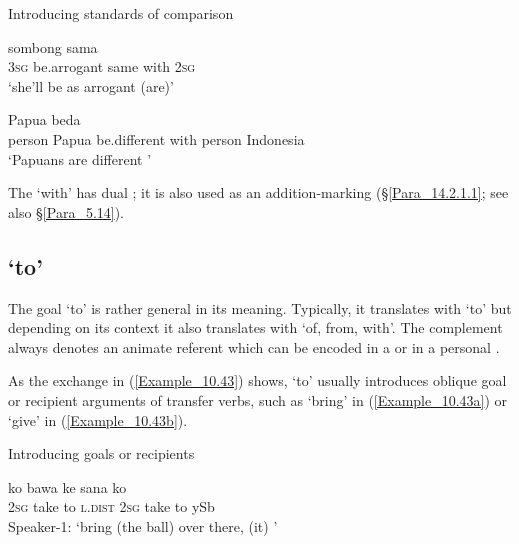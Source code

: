 \begin{styleExampleTitle}
Introducing standards of comparison
\end{styleExampleTitle}

\ea
\label{Example_10.41}
 {sombong} {sama} {} {}\\ %
 \textsc{3sg}  be.arrogant  same  with  \textsc{2sg}\\
\glt 
‘she’ll be as arrogant  (are)’ \textstyleExampleSource{[081006-005-Cv.0002]}
\z

\ea
\label{Example_10.42}
 {Papua} {beda} {} {} {}\\ %
 person  Papua  be.different  with  person  Indonesia\\
\glt 
‘Papuans are different ’ \textstyleExampleSource{[081029-002-Cv.0009]}
\z


The   ‘with’ has dual ; it is also used as an addition-marking  (§\ref{Para_14.2.1.1}; see also §\ref{Para_5.14}).


\subsection{ ‘to’}
\label{Para_10.2.2}
The goal   ‘to’ is rather general in its meaning. Typically, it translates with ‘to’ but depending on its context it also translates with ‘of, from, with’. The complement always denotes an animate referent which can be encoded in a  or in a personal .



As the exchange in (\ref{Example_10.43}) shows,  ‘to’ usually introduces oblique goal or recipient arguments of transfer verbs, such as  ‘bring’ in (\ref{Example_10.43a}) or  ‘give’ in (\ref{Example_10.43b}).


\begin{styleExampleTitle}
Introducing goals or recipients
\end{styleExampleTitle}

\ea
\label{Example_10.43}

\ea
\label{Example_10.43a}
 {ko} {bawa} {ke} {sana} {ko} {} {} {}\\ %
  {}   \textsc{2sg}  take  to  \textsc{l.dist}  \textsc{2sg}  take  to  ySb\\
\glt Speaker-1: ‘bring (the ball) over there,  (it) ’\\
\vspace{5pt}

